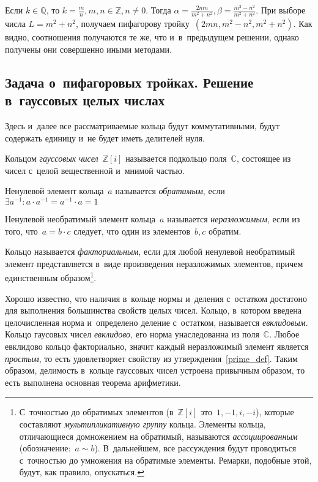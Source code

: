 \documentclass{article}
\begin{document}
Если $k \in \mathbb{Q}$, то $k = \frac{m}{n}, m, n \in \mathbb{Z}, n \ne 0$.
Тогда $\alpha = \frac{2mn}{m^2 + n^2}, \beta = \frac{m^2 - n^2}{m^2 + n^2}$.
При выборе числа $L = m^2 + n^2$, получаем пифагорову
тройку~$(2mn, m^2 - n^2, m^2 + n^2)$. Как видно, соотношения получаются те же,
что и~в~предыдущем решении, однако получены они совершенно иными методами.


\subsection{Задача о~пифагоровых тройках. Решение в~гауссовых целых числах}
Здесь и~далее все рассматриваемые кольца будут коммутативными, будут содержать
единицу и~не будет иметь делителей нуля.
\begin{definition}
  Кольцом \emph{гауссовых чисел}~$\mathbb{Z}[i]$ называется подкольцо
  поля~$\mathbb{C}$, состоящее из чисел с~целой вещественной и~мнимой частью.
\end{definition}
\begin{definition}
  Ненулевой элемент кольца~$a$ называется \emph{обратимым}, если
  $\exists a^{-1}: a \cdot a^{-1} = a^{-1}\cdot a = 1 $
\end{definition}
\begin{definition}
  Ненулевой необратимый элемент кольца~$a$ называется \emph{неразложимым},
  если из того, что~$a = b \cdot c$ следует, что один из элементов~$b, c$
  обратим.
\end{definition}
\begin{definition}
  Кольцо называется \emph{факториальным}, если для любой ненулевой необратимый
  элемент представляется в~виде произведения неразложимых элементов, причем
  единственным образом\footnote{С~точностью до обратимых элементов
  (в~$\mathbb{Z}[i]$ это~$1, -1, i, -i$), которые составляют
  \emph{мультипликативную группу} кольца. Элементы кольца, отличающиеся
  домножением на обратимый, называются \emph{ассоциированным}
  (обозначение:~$a \sim b$). В~дальнейшем, все рассуждения будут проводиться
  с~точностью до умножения на обратимые элементы. Ремарки, подобные этой,
  будут, как правило, опускаться.}.
\end{definition}

Хорошо известно, что наличия в~кольце нормы и~деления с~остатком достатоно для
выполнения большинства свойств целых чисел. Кольцо, в~котором введена
целочисленная норма и~определено деление с~остатком, называется
\emph{евклидовым}. Кольцо гаусовых чисел \emph{евклидово}, его норма
унаследованна из поля~$\mathbb{C}$. Любое евклидово кольцо факториально, значит
каждый неразложимый элемент является \emph{простым}, то есть удовлетворяет
свойству из утверждения~\ref{prime_def}. Таким образом, делимость в~кольце
гауссовых чисел устроена привычным образом, то есть выполнена основная теорема
арифметики.
\end{document}

